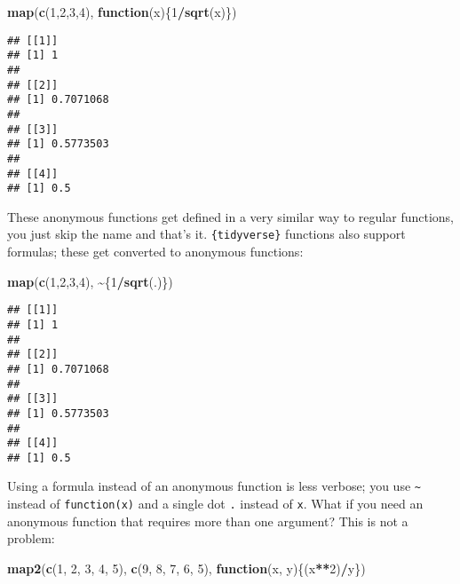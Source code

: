 \documentclass[
]{article}
\newenvironment{Shaded}{\begin{snugshade}}{\end{snugshade}}
\newcommand{\ControlFlowTok}[1]{\textcolor[rgb]{0.13,0.29,0.53}{\textbf{#1}}}
\newcommand{\DecValTok}[1]{\textcolor[rgb]{0.00,0.00,0.81}{#1}}
\newcommand{\KeywordTok}[1]{\textcolor[rgb]{0.13,0.29,0.53}{\textbf{#1}}}
\newcommand{\NormalTok}[1]{#1}
\newcommand{\OperatorTok}[1]{\textcolor[rgb]{0.81,0.36,0.00}{\textbf{#1}}}
\begin{document}
\begin{Shaded}
\begin{Highlighting}[]
\KeywordTok{map}\NormalTok{(}\KeywordTok{c}\NormalTok{(}\DecValTok{1}\NormalTok{,}\DecValTok{2}\NormalTok{,}\DecValTok{3}\NormalTok{,}\DecValTok{4}\NormalTok{), }\ControlFlowTok{function}\NormalTok{(x)\{}\DecValTok{1}\OperatorTok{/}\KeywordTok{sqrt}\NormalTok{(x)\})}
\end{Highlighting}
\end{Shaded}

\begin{verbatim}
## [[1]]
## [1] 1
## 
## [[2]]
## [1] 0.7071068
## 
## [[3]]
## [1] 0.5773503
## 
## [[4]]
## [1] 0.5
\end{verbatim}

These anonymous functions get defined in a very similar way to regular functions, you just skip the
name and that's it. \texttt{\{tidyverse\}} functions also support formulas; these get converted to anonymous functions:

\begin{Shaded}
\begin{Highlighting}[]
\KeywordTok{map}\NormalTok{(}\KeywordTok{c}\NormalTok{(}\DecValTok{1}\NormalTok{,}\DecValTok{2}\NormalTok{,}\DecValTok{3}\NormalTok{,}\DecValTok{4}\NormalTok{), }\OperatorTok{\textasciitilde{}}\NormalTok{\{}\DecValTok{1}\OperatorTok{/}\KeywordTok{sqrt}\NormalTok{(.)\})}
\end{Highlighting}
\end{Shaded}

\begin{verbatim}
## [[1]]
## [1] 1
## 
## [[2]]
## [1] 0.7071068
## 
## [[3]]
## [1] 0.5773503
## 
## [[4]]
## [1] 0.5
\end{verbatim}

Using a formula instead of an anonymous function is less verbose; you use \texttt{\textasciitilde{}} instead of \texttt{function(x)}
and a single dot \texttt{.} instead of \texttt{x}. What if you need an anonymous function that requires more than
one argument? This is not a problem:

\begin{Shaded}
\begin{Highlighting}[]
\KeywordTok{map2}\NormalTok{(}\KeywordTok{c}\NormalTok{(}\DecValTok{1}\NormalTok{, }\DecValTok{2}\NormalTok{, }\DecValTok{3}\NormalTok{, }\DecValTok{4}\NormalTok{, }\DecValTok{5}\NormalTok{), }\KeywordTok{c}\NormalTok{(}\DecValTok{9}\NormalTok{, }\DecValTok{8}\NormalTok{, }\DecValTok{7}\NormalTok{, }\DecValTok{6}\NormalTok{, }\DecValTok{5}\NormalTok{), }\ControlFlowTok{function}\NormalTok{(x, y)\{(x}\OperatorTok{**}\DecValTok{2}\NormalTok{)}\OperatorTok{/}\NormalTok{y\})}
\end{Highlighting}
\end{Shaded}
\end{document}
